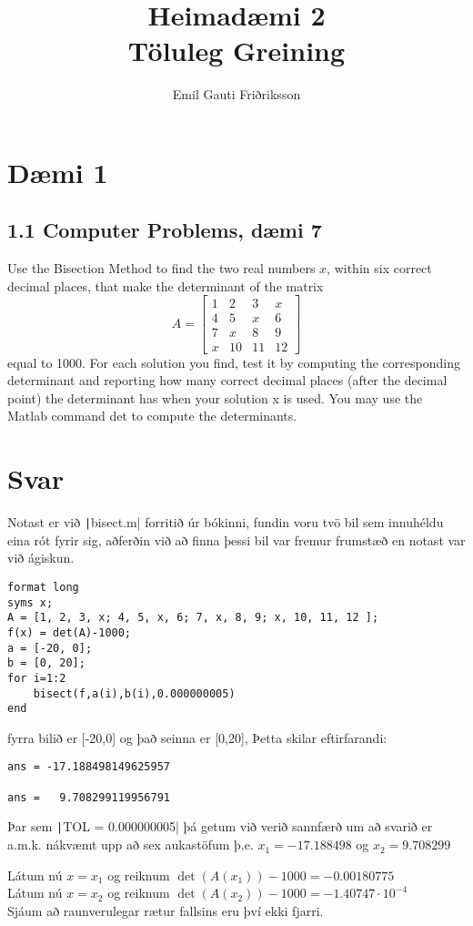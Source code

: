\documentclass[11pt]{article}
\title{Heimadæmi 2\\ \vspace{0.4cm} \large Töluleg Greining}
\author{Emil Gauti Friðriksson}
\begin{document}
\maketitle
\section*{Dæmi 1}
\subsection*{1.1 Computer Problems, dæmi 7}
Use the Bisection Method to find the two real numbers $x$, within six correct decimal places,
that make the determinant of the matrix
$$A =
\begin{bmatrix}
1 & 2  & 3  & x\\
4 & 5  & x  & 6\\
7 & x  & 8  & 9\\
x & 10 & 11 & 12
\end{bmatrix}
$$
equal to 1000. For each solution you find, test it by computing the corresponding determinant
and reporting how many correct decimal places (after the decimal point) the determinant has
when your solution x is used. You may use the Matlab command det to compute the
determinants.
\section*{Svar}
Notast er við \texttt|bisect.m| forritið úr bókinni, fundin voru tvö bil sem innuhéldu eina rót fyrir sig, aðferðin við að finna þessi bil var fremur frumstæð en notast var við ágiskun.
\begin{verbatim}
format long
syms x;
A = [1, 2, 3, x; 4, 5, x, 6; 7, x, 8, 9; x, 10, 11, 12 ];
f(x) = det(A)-1000;
a = [-20, 0]; 
b = [0, 20]; 
for i=1:2
    bisect(f,a(i),b(i),0.000000005)
end
\end{verbatim}
fyrra bilið er [-20,0] og það seinna er [0,20], Þetta skilar eftirfarandi:
\begin{verbatim}
ans = -17.188498149625957

ans =   9.708299119956791
\end{verbatim}
Þar sem \texttt|TOL = 0.000000005| þá getum við verið sannfærð um að svarið er a.m.k. nákvæmt upp að sex aukastöfum þ.e. $x_1 = -17.188498$ og $x_2 = 9.708299$

\noindent Látum nú $x=x_1$ og reiknum $\det(A(x_1))-1000 = -0.00180775$\\
Látum nú $x=x_2$ og reiknum $\det(A(x_2))-1000 = -1.40747 \cdot 10^{-4}$\\
Sjáum að raunverulegar rætur fallsins eru því ekki fjarri.
\end{document}
